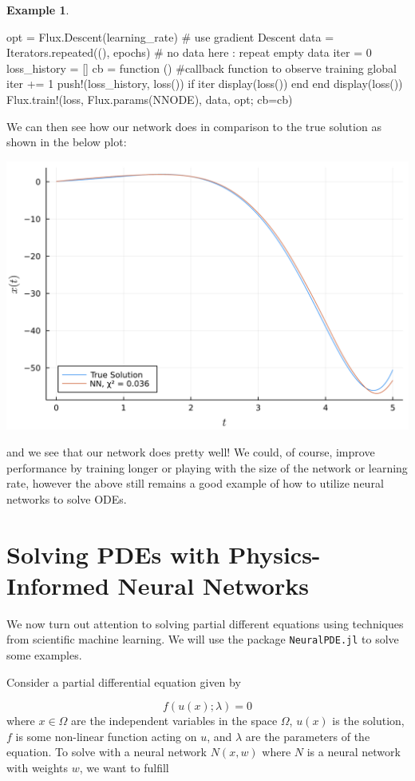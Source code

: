 \documentclass{CUP-JNL-DTM}%
\theoremstyle{definition}
\newtheorem{example}[theorem]{Example}
\numberwithin{equation}{section}
\begin{document}
\begin{example}
\begin{jllisting}
opt = Flux.Descent(learning_rate) # use gradient Descent
data = Iterators.repeated((), epochs) # no data here : repeat empty data
iter = 0
loss_history = []
cb = function () #callback function to observe training
  global iter += 1
  push!(loss_history, loss())
  if iter %
    display(loss())
  end
end
display(loss())
Flux.train!(loss, Flux.params(NNODE), data, opt; cb=cb)
\end{jllisting}
We can then see how our network does in comparison to the true solution as shown in the below plot:

\begin{center}
\includegraphics[width=0.45\linewidth]{figures/ODE_example.png}
\end{center}
and we see that our network does pretty well! We could, of course, improve performance by training longer or playing with the size of the network or learning rate, however the above still remains a good example of how to utilize neural networks to solve ODEs. 
	
\end{example}


\section{Solving PDEs with Physics-Informed Neural Networks}

We now turn out attention to solving partial different equations using techniques from scientific machine learning. We will use the package \texttt{NeuralPDE.jl} \cite{zubovNeuralPDEAutomatingPhysicsInformed2021} to solve some examples. 

Consider a partial differential equation given by 

\begin{equation}
	f(u(x); \lambda) = 0
\end{equation}
where $x \in \Omega$ are the independent variables in the space $\Omega$, $u(x)$ is the solution, $f$ is some non-linear function acting on $u$, and $\lambda$ are the parameters of the equation. To solve with a neural network $N(x, w)$ where $N$ is a neural network with weights $w$, we want to fulfill 
\end{document}
